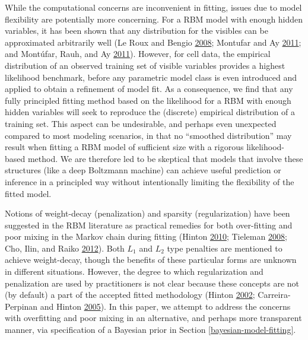 \documentclass[12pt]{article}
\theoremstyle{definition}
\begin{document}
While the computational concerns are inconvenient in fitting, issues due
to model flexibility are potentially more concerning. For a RBM model
with enough hidden variables, it has been shown that any distribution
for the visibles can be approximated arbitrarily well (Le Roux and
Bengio \protect\hyperlink{ref-le2008representational}{2008}; Montufar
and Ay \protect\hyperlink{ref-montufar2011refinements}{2011}; and
Montúfar, Rauh, and Ay
\protect\hyperlink{ref-montufar2011expressive}{2011}). However, for cell
data, the empirical distribution of an observed training set of visible
variables provides a highest likelihood benchmark, before any parametric
model class is even introduced and applied to obtain a refinement of
model fit. As a consequence, we find that any fully principled fitting
method based on the likelihood for a RBM with enough hidden variables
will seek to reproduce the (discrete) empirical distribution of a
training set. This aspect can be undesirable, and perhaps even
unexpected compared to most modeling scenarios, in that no ``smoothed
distribution'' may result when fitting a RBM model of sufficient size
with a rigorous likelihood-based method. We are therefore led to be
skeptical that models that involve these structures (like a deep
Boltzmann machine) can achieve useful prediction or inference in a
principled way without intentionally limiting the flexibility of the
fitted model.

Notions of weight-decay (penalization) and sparsity (regularization)
have been suggested in the RBM literature as practical remedies for both
over-fitting and poor mixing in the Markov chain during fitting (Hinton
\protect\hyperlink{ref-hinton2010practical}{2010}; Tieleman
\protect\hyperlink{ref-tieleman2008training}{2008}; Cho, Ilin, and Raiko
\protect\hyperlink{ref-cho2012tikhonov}{2012}). Both \(L_1\) and \(L_2\)
type penalties are mentioned to achieve weight-decay, though the
benefits of these particular forms are unknown in different situations.
However, the degree to which regularization and penalization are used by
practitioners is not clear because these concepts are not (by default) a
part of the accepted fitted methodology (Hinton
\protect\hyperlink{ref-hinton2002training}{2002}; Carreira-Perpinan and
Hinton \protect\hyperlink{ref-carreira2005contrastive}{2005}). In this
paper, we attempt to address the concerns with overfitting and poor
mixing in an alternative, and perhaps more transparent manner, via
specification of a Bayesian prior in Section
\ref{bayesian-model-fitting}.
\end{document}
